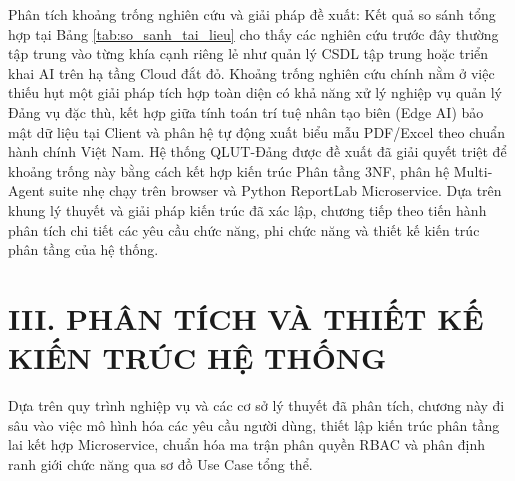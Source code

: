 \documentclass[12pt,a4paper]{report}
\begin{document}
Phân tích khoảng trống nghiên cứu và giải pháp đề xuất: Kết quả so sánh tổng hợp tại Bảng \ref{tab:so_sanh_tai_lieu} cho thấy các nghiên cứu trước đây thường tập trung vào từng khía cạnh riêng lẻ như quản lý CSDL tập trung hoặc triển khai AI trên hạ tầng Cloud đắt đỏ. Khoảng trống nghiên cứu chính nằm ở việc thiếu hụt một giải pháp tích hợp toàn diện có khả năng xử lý nghiệp vụ quản lý Đảng vụ đặc thù, kết hợp giữa tính toán trí tuệ nhân tạo biên (Edge AI) bảo mật dữ liệu tại Client và phân hệ tự động xuất biểu mẫu PDF/Excel theo chuẩn hành chính Việt Nam. Hệ thống QLUT-Đảng được đề xuất đã giải quyết triệt để khoảng trống này bằng cách kết hợp kiến trúc Phân tầng 3NF, phân hệ Multi-Agent suite nhẹ chạy trên browser và Python ReportLab Microservice. Dựa trên khung lý thuyết và giải pháp kiến trúc đã xác lập, chương tiếp theo tiến hành phân tích chi tiết các yêu cầu chức năng, phi chức năng và thiết kế kiến trúc phân tầng của hệ thống.

\section*{III. PHÂN TÍCH VÀ THIẾT KẾ KIẾN TRÚC HỆ THỐNG}

Dựa trên quy trình nghiệp vụ và các cơ sở lý thuyết đã phân tích, chương này đi sâu vào việc mô hình hóa các yêu cầu người dùng, thiết lập kiến trúc phân tầng lai kết hợp Microservice, chuẩn hóa ma trận phân quyền RBAC và phân định ranh giới chức năng qua sơ đồ Use Case tổng thể.
\end{document}
